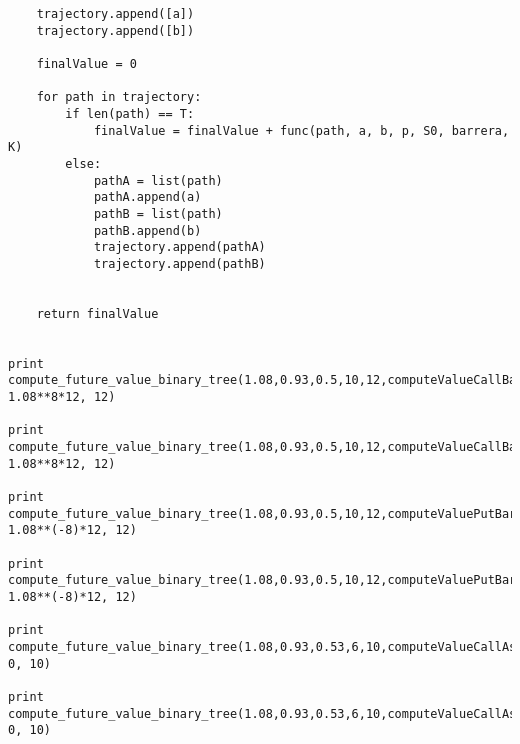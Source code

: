 \documentclass{apuntes}
\begin{document}
\begin{lstlisting}
	trajectory.append([a])
	trajectory.append([b])

	finalValue = 0

	for path in trajectory:
		if len(path) == T:
			finalValue = finalValue + func(path, a, b, p, S0, barrera, K)
		else:
			pathA = list(path)
			pathA.append(a)
			pathB = list(path)
			pathB.append(b)
			trajectory.append(pathA)
			trajectory.append(pathB)


	return finalValue


print compute_future_value_binary_tree(1.08,0.93,0.5,10,12,computeValueCallBarreraUp_Out, 1.08**8*12, 12)

print compute_future_value_binary_tree(1.08,0.93,0.5,10,12,computeValueCallBarreraUp_In, 1.08**8*12, 12)

print compute_future_value_binary_tree(1.08,0.93,0.5,10,12,computeValuePutBarreraDown_Out, 1.08**(-8)*12, 12)

print compute_future_value_binary_tree(1.08,0.93,0.5,10,12,computeValuePutBarreraDown_In, 1.08**(-8)*12, 12)

print compute_future_value_binary_tree(1.08,0.93,0.53,6,10,computeValueCallAsiaticaAritmetica, 0, 10)

print compute_future_value_binary_tree(1.08,0.93,0.53,6,10,computeValueCallAsiaticaGeometrica, 0, 10)\end{lstlisting}

\printindex
\end{document}
